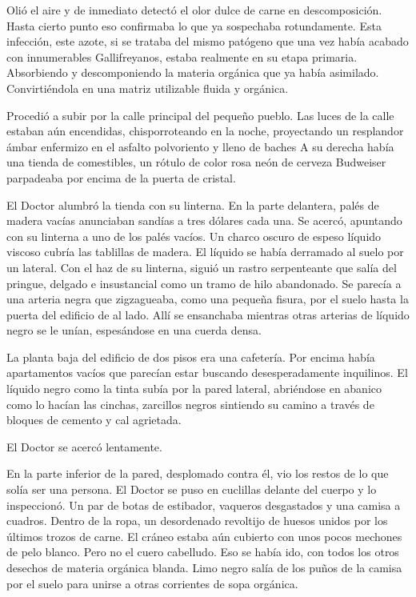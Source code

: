 Olió el aire y de inmediato detectó el olor dulce de carne en
descomposición. Hasta cierto punto eso confirmaba lo que ya sospechaba
rotundamente. Esta infección, este azote, si se trataba del mismo
patógeno que una vez había acabado con innumerables Gallifreyanos,
estaba realmente en su etapa primaria. Absorbiendo y descomponiendo la
materia orgánica que ya había asimilado. Convirtiéndola en una matriz
utilizable fluida y orgánica.

Procedió a subir por la calle principal del pequeño pueblo. Las luces de
la calle estaban aún encendidas, chisporroteando en la noche,
proyectando un resplandor ámbar enfermizo en el asfalto polvoriento y
lleno de baches A su derecha había una tienda de comestibles, un rótulo
de color rosa neón de cerveza Budweiser parpadeaba por encima de la
puerta de cristal.

El Doctor alumbró la tienda con su linterna. En la parte delantera,
palés de madera vacías anunciaban sandías a tres dólares cada una. Se
acercó, apuntando con su linterna a uno de los palés vacíos. Un charco
oscuro de espeso líquido viscoso cubría las tablillas de madera. El
líquido se había derramado al suelo por un lateral. Con el haz de su
linterna, siguió un rastro serpenteante que salía del pringue, delgado e
insustancial como un tramo de hilo abandonado. Se parecía a una arteria
negra que zigzagueaba, como una pequeña fisura, por el suelo hasta la
puerta del edificio de al lado. Allí se ensanchaba mientras otras
arterias de líquido negro se le unían, espesándose en una cuerda densa.

La planta baja del edificio de dos pisos era una cafetería. Por encima
había apartamentos vacíos que parecían estar buscando desesperadamente
inquilinos. El líquido negro como la tinta subía por la pared lateral,
abriéndose en abanico como lo hacían las cinchas, zarcillos negros
sintiendo su camino a través de bloques de cemento y cal agrietada.

El Doctor se acercó lentamente.

En la parte inferior de la pared, desplomado contra él, vio los restos
de lo que solía ser una persona. El Doctor se puso en cuclillas delante
del cuerpo y lo inspeccionó. Un par de botas de estibador, vaqueros
desgastados y una camisa a cuadros. Dentro de la ropa, un desordenado
revoltijo de huesos unidos por los últimos trozos de carne. El cráneo
estaba aún cubierto con unos pocos mechones de pelo blanco. Pero no el
cuero cabelludo. Eso se había ido, con todos los otros desechos de
materia orgánica blanda. Limo negro salía de los puños de la camisa por
el suelo para unirse a otras corrientes de sopa orgánica.


